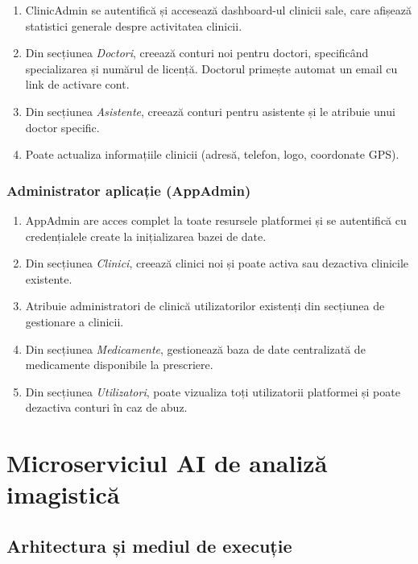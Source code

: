\documentclass[12pt, a4paper]{report}
\begin{document}
\begin{enumerate}
    \item ClinicAdmin se autentifică și accesează dashboard-ul clinicii sale,
          care afișează statistici generale despre activitatea clinicii.
    \item Din secțiunea \textit{Doctori}, creează conturi noi pentru doctori,
          specificând specializarea și numărul de licență. Doctorul primește
          automat un email cu link de activare cont.
    \item Din secțiunea \textit{Asistente}, creează conturi pentru asistente
          și le atribuie unui doctor specific.
    \item Poate actualiza informațiile clinicii (adresă, telefon, logo, coordonate
          GPS).
\end{enumerate}

\subsubsection{Administrator aplicație (AppAdmin)}

\begin{enumerate}
    \item AppAdmin are acces complet la toate resursele platformei și se
          autentifică cu credențialele create la inițializarea bazei de date.
    \item Din secțiunea \textit{Clinici}, creează clinici noi și poate activa
          sau dezactiva clinicile existente.
    \item Atribuie administratori de clinică utilizatorilor existenți din
          secțiunea de gestionare a clinicii.
    \item Din secțiunea \textit{Medicamente}, gestionează baza de date centralizată
          de medicamente disponibile la prescriere.
    \item Din secțiunea \textit{Utilizatori}, poate vizualiza toți utilizatorii
          platformei și poate dezactiva conturi în caz de abuz.
\end{enumerate}

\section{Microserviciul AI de analiză imagistică}

\subsection{Arhitectura și mediul de execuție}
\end{document}
